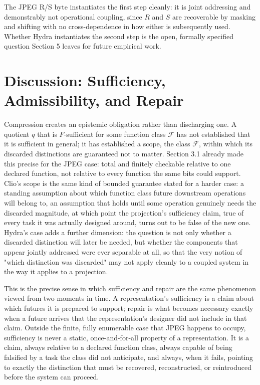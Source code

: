 \documentclass[11pt]{article}
\begin{document}
The JPEG R/S byte instantiates the first step cleanly: it is joint addressing and demonstrably not operational coupling, since $R$ and $S$ are recoverable by masking and shifting with no cross-dependence in how either is subsequently used. Whether Hydra instantiates the second step is the open, formally specified question Section 5 leaves for future empirical work.

\section{Discussion: Sufficiency, Admissibility, and Repair}

Compression creates an epistemic obligation rather than discharging one. A quotient $q$ that is $F$-sufficient for some function class $\mathcal{F}$ has not established that it is sufficient in general; it has established a scope, the class $\mathcal{F}$, within which its discarded distinctions are guaranteed not to matter. Section 3.1 already made this precise for the JPEG case: total and finitely checkable relative to one declared function, not relative to every function the same bits could support. Clio's scope is the same kind of bounded guarantee stated for a harder case: a standing assumption about which function class future downstream operations will belong to, an assumption that holds until some operation genuinely needs the discarded magnitude, at which point the projection's sufficiency claim, true of every task it was actually designed around, turns out to be false of the new one. Hydra's case adds a further dimension: the question is not only whether a discarded distinction will later be needed, but whether the components that appear jointly addressed were ever separable at all, so that the very notion of "which distinction was discarded" may not apply cleanly to a coupled system in the way it applies to a projection.

This is the precise sense in which sufficiency and repair are the same phenomenon viewed from two moments in time. A representation's sufficiency is a claim about which futures it is prepared to support; repair is what becomes necessary exactly when a future arrives that the representation's designer did not include in that claim. Outside the finite, fully enumerable case that JPEG happens to occupy, sufficiency is never a static, once-and-for-all property of a representation. It is a claim, always relative to a declared function class, always capable of being falsified by a task the class did not anticipate, and always, when it fails, pointing to exactly the distinction that must be recovered, reconstructed, or reintroduced before the system can proceed.
\end{document}
